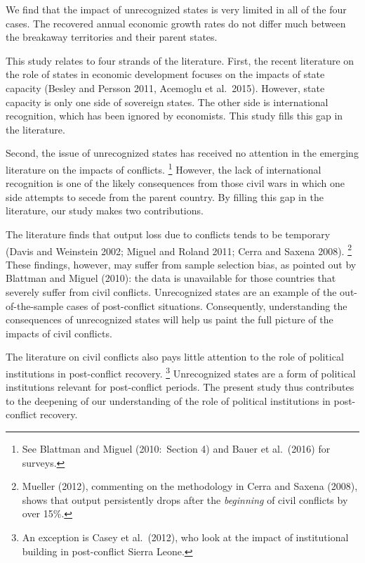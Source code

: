 \documentclass[12pt,a4paper]{article}%
\begin{document}
We find that the impact of unrecognized states is very limited in all of the four cases. 
The recovered annual economic growth rates do not differ much between the breakaway territories and their parent states.

This study relates to four strands of the literature. 
First, the recent literature on the role of states in economic development focuses on the impacts of state capacity (Besley and Persson 2011, Acemoglu et al.\ 2015). 
However, state capacity is only one side of sovereign states. 
The other side is international recognition, which has been ignored by economists. 
This study fills this gap in the literature.

Second, the issue of unrecognized states has received no attention in the emerging literature on the impacts of conflicts.%
\footnote{
	See Blattman and Miguel (2010:\ Section 4) and Bauer et al.\ (2016) for surveys.
}  
However, the lack of international recognition is one of the likely consequences from those civil wars in which one side attempts to secede from the parent country. 
By filling this gap in the literature, our study makes two contributions. 

The literature finds that output loss due to conflicts tends to be temporary (Davis and Weinstein 2002; Miguel and Roland 2011; Cerra and Saxena 2008).%
\footnote{
	Mueller (2012), commenting on the methodology in Cerra and Saxena (2008), shows that output persistently drops after the \textit{beginning} of civil conflicts by over 15\%.
} 
These findings, however, may suffer from sample selection bias, as pointed out by Blattman and Miguel (2010): the data is unavailable for those countries that severely suffer from civil conflicts.   
Unrecognized states are an example of the out-of-the-sample cases of post-conflict situations. 
Consequently, understanding the consequences of unrecognized states will help us paint the full picture of the impacts of civil conflicts. 

The literature on civil conflicts also pays little attention to the role of political institutions in post-conflict recovery.%
\footnote{
	An exception is Casey et al.\ (2012), who look at the impact of institutional building in post-conflict Sierra Leone.
}
Unrecognized states are a form of political institutions relevant for post-conflict periods. 
The present study thus contributes to the deepening of our understanding of the role of political institutions in post-conflict recovery.
\end{document}
